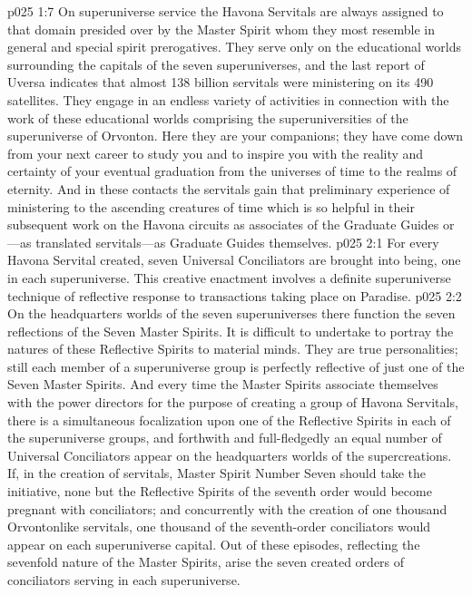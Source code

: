 \vs p025 1:7 On superuniverse service the Havona Servitals are always assigned to that domain presided over by the Master Spirit whom they most resemble in general and special spirit prerogatives. They serve only on the educational worlds surrounding the capitals of the seven superuniverses, and the last report of Uversa indicates that almost 138 billion servitals were ministering on its 490 satellites. They engage in an endless variety of activities in connection with the work of these educational worlds comprising the superuniversities of the superuniverse of Orvonton. Here they are your companions; they have come down from your next career to study you and to inspire you with the reality and certainty of your eventual graduation from the universes of time to the realms of eternity. And in these contacts the servitals gain that preliminary experience of ministering to the ascending creatures of time which is so helpful in their subsequent work on the Havona circuits as associates of the Graduate Guides or---as translated servitals---as Graduate Guides themselves.
\vs p025 2:1 For every Havona Servital created, seven Universal Conciliators are brought into being, one in each superuniverse. This creative enactment involves a definite superuniverse technique of reflective response to transactions taking place on Paradise.
\vs p025 2:2 On the headquarters worlds of the seven superuniverses there function the seven reflections of the Seven Master Spirits. It is difficult to undertake to portray the natures of these Reflective Spirits to material minds. They are true personalities; still each member of a superuniverse group is perfectly reflective of just one of the Seven Master Spirits. And every time the Master Spirits associate themselves with the power directors for the purpose of creating a group of Havona Servitals, there is a simultaneous focalization upon one of the Reflective Spirits in each of the superuniverse groups, and forthwith and full\hyp{}fledgedly an equal number of Universal Conciliators appear on the headquarters worlds of the supercreations. If, in the creation of servitals, Master Spirit Number Seven should take the initiative, none but the Reflective Spirits of the seventh order would become pregnant with conciliators; and concurrently with the creation of one thousand Orvontonlike servitals, one thousand of the seventh\hyp{}order conciliators would appear on each superuniverse capital. Out of these episodes, reflecting the sevenfold nature of the Master Spirits, arise the seven created orders of conciliators serving in each superuniverse.\plusone
